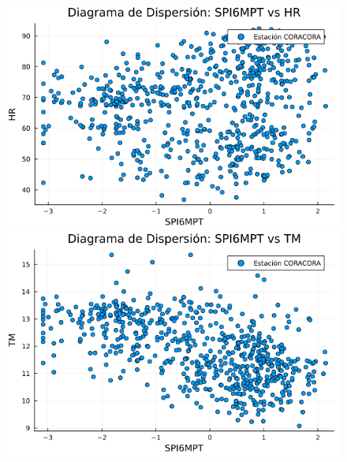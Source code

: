 \begin{figure}[htbp]
\begin{minipage}{0.32\textwidth}
\end{minipage}

\vspace{0.5cm}  %

\begin{minipage}{0.32\textwidth}
    \centering
    \includegraphics[width=\linewidth]{Capitulos/Scaterplot/CORACORA_SPI6MPT_vs_HR.png}
\end{minipage}\hfill
\begin{minipage}{0.32\textwidth}
    \centering
    \includegraphics[width=\linewidth]{Capitulos/Scaterplot/CORACORA_SPI6MPT_vs_TM.png}
\end{minipage}\hfill
\begin{minipage}{0.32\textwidth}
    \centering

\end{minipage}
\end{figure}
